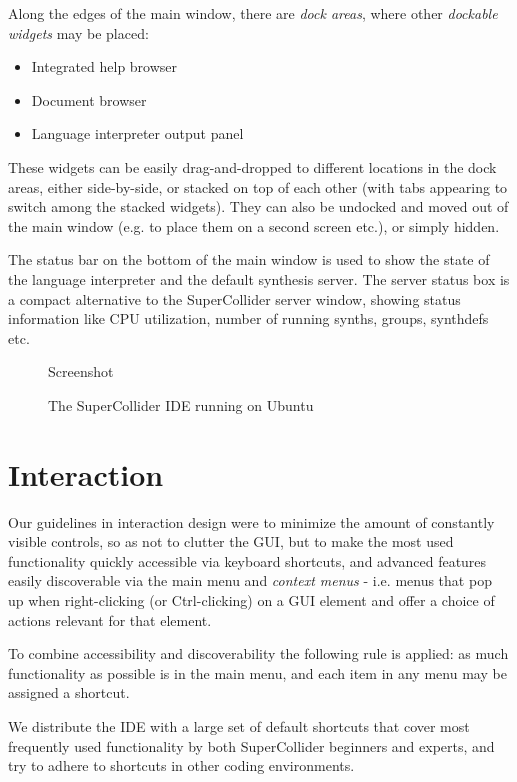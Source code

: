 \documentclass[11pt,a4paper]{article}
\begin{document}
Along the edges of the main window, there are \emph{dock areas}, where other \emph{dockable widgets} may be placed:
\begin{itemize}
  \item Integrated help browser
  \item Document browser
  \item Language interpreter output panel
\end{itemize}

These widgets can be easily drag-and-dropped to different locations in the dock areas, either side-by-side, or stacked
on top of each other (with tabs appearing to switch among the stacked widgets). They can also be undocked and moved out
of the main window (e.g. to place them on a second screen etc.), or simply hidden.

The status bar on the bottom of the main window is used to show the state of the language interpreter and the default
synthesis server. The server status box is a compact alternative to the SuperCollider server window, showing status
information like CPU utilization, number of running synths, groups, synthdefs etc.

\begin{figure*}[]
  \centering
  Screenshot
  \caption{The SuperCollider IDE running on Ubuntu}
  \label{fig:mainwin}
\end{figure*}

\section{Interaction}

Our guidelines in interaction design were to minimize the amount of constantly visible controls, so as not to clutter
the GUI, but to make the most used functionality quickly accessible via keyboard shortcuts, and advanced features easily
discoverable via the main menu and \emph{context menus} - i.e. menus that pop up when right-clicking (or Ctrl-clicking)
on a GUI element and offer a choice of actions relevant for that element.

To combine accessibility and discoverability the following rule is applied: as much functionality as possible is
in the main menu, and each item in any menu may be assigned a shortcut.

We distribute the IDE with a large set of default shortcuts that cover most frequently used functionality by both
SuperCollider beginners and experts, and try to adhere to shortcuts in other coding environments.
\end{document}
